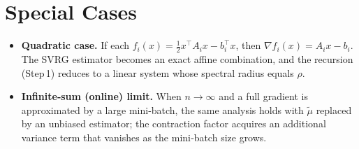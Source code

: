 \documentclass{article}
\begin{document}
\section*{Special Cases}
\begin{itemize}
\item \textbf{Quadratic case.} If each $f_i(x)=\frac12 x^{\top}A_i x-b_i^{\top}x$, then $\nabla f_i(x)=A_i x-b_i$. The SVRG estimator becomes an exact affine combination, and the recursion (Step 1) reduces to a linear system whose spectral radius equals $\rho$.
\item \textbf{Infinite‑sum (online) limit.} When $n\to\infty$ and a full gradient is approximated by a large mini‑batch, the same analysis holds with $\tilde{\mu}$ replaced by an unbiased estimator; the contraction factor acquires an additional variance term that vanishes as the mini‑batch size grows.
\end{itemize}
\end{document}
